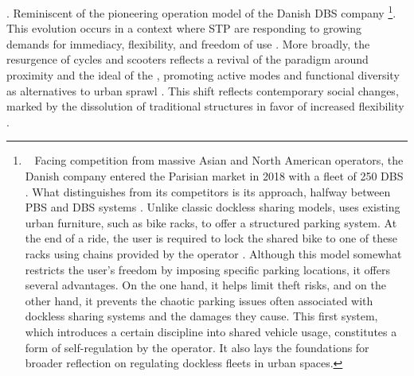 \begin{refsegment}
{} \textcolor{blue}{\autocites[3151]{ville_de_paris_bulletin_2019}[90]{6t-bureau_de_recherche_livre_2019}}. Reminiscent of the pioneering operation model of the Danish \acrshort{DBS} company \footnote{~
    Facing competition from massive Asian and North American operators, the Danish company  entered the Parisian market in 2018 with a fleet of 250 \acrshort{DBS} \textcolor{blue}{\autocite[20]{6t-bureau_de_recherche_etude_2018}}. What distinguishes  from its competitors is its  approach, halfway between \acrshort{PBS} and \acrshort{DBS} systems \textcolor{blue}{\autocite[20]{6t-bureau_de_recherche_etude_2018}}. Unlike classic dockless sharing models,  uses existing urban furniture, such as bike racks, to offer a structured parking system. At the end of a ride, the user is required to lock the shared bike to one of these racks using chains provided by the operator \textcolor{blue}{\autocite[20]{6t-bureau_de_recherche_etude_2018}}. Although this model somewhat restricts the user's freedom by imposing specific parking locations, it offers several advantages. On the one hand, it helps limit theft risks, and on the other hand, it prevents the chaotic parking issues often associated with dockless sharing systems and the damages they cause. This first system, which introduces a certain discipline into shared vehicle usage, constitutes a form of self-regulation by the operator. It also lays the foundations for broader reflection on regulating dockless fleets in urban spaces.
}. This evolution occurs in a context where \acrshort{STP} are responding to growing demands for immediacy, flexibility, and freedom of use \textcolor{blue}{\autocite[8]{frere_services_2018}}. More broadly, the resurgence of cycles and scooters reflects a revival of the paradigm around proximity and the ideal of the , promoting active modes and functional diversity as alternatives to urban sprawl \textcolor{blue}{\autocite[44]{eskenazi_voir_2022}}. This shift reflects contemporary social changes, marked by the dissolution of traditional structures in favor of increased flexibility \textcolor{blue}{\autocite[130-142]{bauman_liquid_2000}}.%


\end{refsegment}
